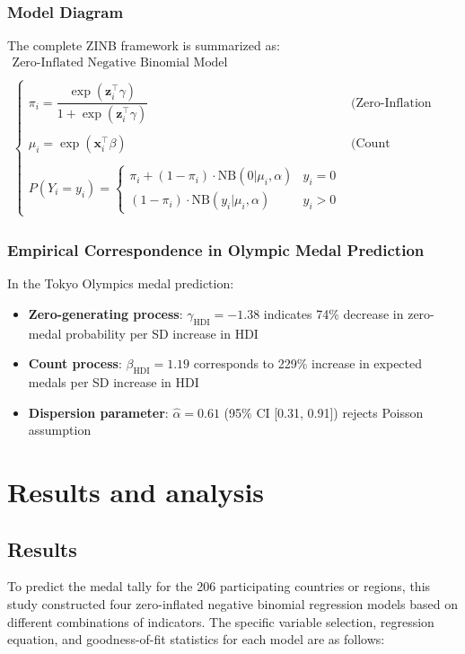 \documentclass[11pt,twoside]{article}
\numberwithin{Theorem}{section}
\numberwithin{Definition}{section}
\numberwithin{Lemma}{section}
\numberwithin{Algorithm}{section}
\numberwithin{equation}{section}
\begin{document}
\subsubsection{Model Diagram}
The complete ZINB framework is summarized as:
\[
\boxed{
\begin{array}{c}
\text{Zero-Inflated Negative Binomial Model} \\
\\
\begin{cases}
\pi_i = \dfrac{\exp(\mathbf{z}_i^{\top}\gamma)}{1+\exp(\mathbf{z}_i^{\top}\gamma)} & \text{(Zero-Inflation Component)} \\
\\
\mu_i = \exp(\mathbf{x}_i^{\top}\beta) & \text{(Count Component)} \\
\\
P(Y_i=y_i) = \begin{cases} 
\pi_i + (1-\pi_i) \cdot \text{NB}(0|\mu_i,\alpha) & y_i=0 \\
(1-\pi_i) \cdot \text{NB}(y_i|\mu_i,\alpha) & y_i>0 
\end{cases}
\end{cases}
\end{array}
}
\]
\subsubsection{Empirical Correspondence in Olympic Medal Prediction}
In the Tokyo Olympics medal prediction:
\begin{itemize}
    \item \textbf{Zero-generating process}: $\gamma_{\text{HDI}} = -1.38$ indicates 74\% decrease in zero-medal probability per SD increase in HDI
    \item \textbf{Count process}: $\beta_{\text{HDI}} = 1.19$ corresponds to 229\% increase in expected medals per SD increase in HDI
    \item \textbf{Dispersion parameter}: $\hat{\alpha} = 0.61$ (95\% CI [0.31, 0.91]) rejects Poisson assumption
\end{itemize}

\section{Results and analysis}
\subsection{Results}

To predict the medal tally for the 206 participating countries or regions, this study constructed four zero-inflated negative binomial regression models based on different combinations of indicators. The specific variable selection, regression equation, and goodness-of-fit statistics for each model are as follows:
\end{document}
